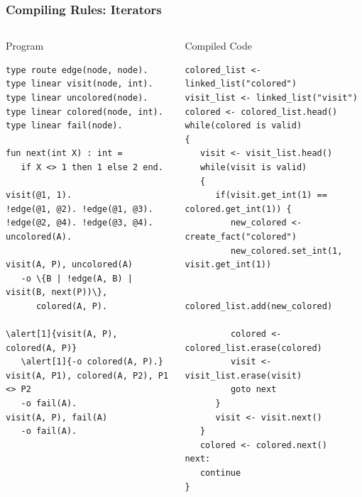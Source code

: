 \documentclass{beamer}
\let\oldalert\alert
\renewcommand{\alert}[2][]{%
  \if\relax\detokenize{#1}\relax%
    \oldalert{#2}%
  \else
    \oldalert<#1>{#2}%
  \fi}
\begin{document}
\begin{frame}[fragile]
   \frametitle{Compiling Rules: Iterators}
   \begin{columns}[t]
     \begin{block}{Program}
       \begin{Verbatim}[fontsize=\tiny,commandchars=\\\{\},frame=single]
type route edge(node, node).
type linear visit(node, int).
type linear uncolored(node).
type linear colored(node, int).
type linear fail(node).

fun next(int X) : int =
   if X <> 1 then 1 else 2 end.

visit(@1, 1).
!edge(@1, @2). !edge(@1, @3).
!edge(@2, @4). !edge(@3, @4).
uncolored(A).

visit(A, P), uncolored(A)
   -o \{B | !edge(A, B) | visit(B, next(P))\},
      colored(A, P).

\alert[1]{visit(A, P), colored(A, P)}
   \alert[1]{-o colored(A, P).}
visit(A, P1), colored(A, P2), P1 <> P2
   -o fail(A).
visit(A, P), fail(A)
   -o fail(A).
\end{Verbatim}
     \end{block}
   \begin{block}{Compiled Code}
\begin{Verbatim}[fontsize=\tiny,frame=single]
colored_list <- linked_list("colored")
visit_list <- linked_list("visit")
colored <- colored_list.head()
while(colored is valid)
{
   visit <- visit_list.head()
   while(visit is valid)
   {
      if(visit.get_int(1) == colored.get_int(1)) {
         new_colored <- create_fact("colored")
         new_colored.set_int(1, visit.get_int(1))

         colored_list.add(new_colored)

         colored <- colored_list.erase(colored)
         visit <- visit_list.erase(visit)
         goto next
      }
      visit <- visit.next()
   }
   colored <- colored.next()
next:
   continue
}
\end{Verbatim}
   \end{block}
   \end{columns}
\end{frame}
\end{document}
